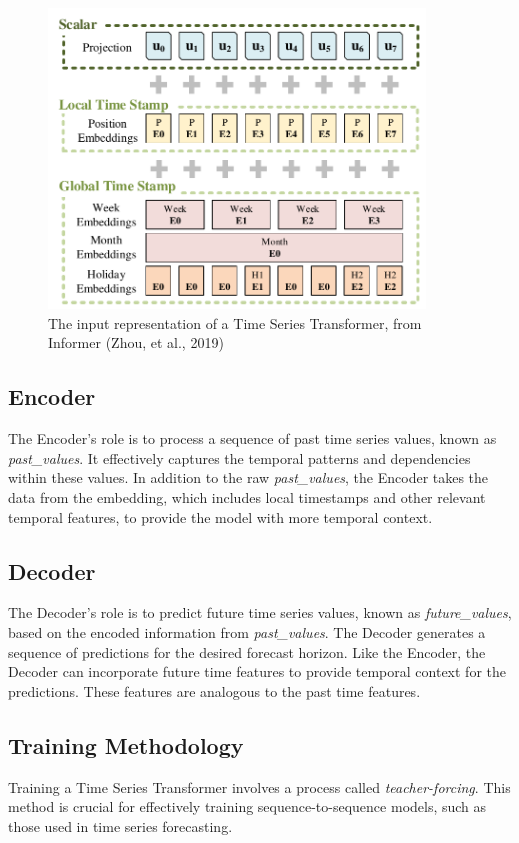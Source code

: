 \begin{figure}[htbp]
    \centering
    \includegraphics[width=10cm]{3_ChapterTranformerVariants/figuras/Embbeding.pdf}
    \caption{The input representation of a Time Series Transformer, from Informer (Zhou, et al., 2019)\cite{zhou2021informerefficienttransformerlong}}
    \end{figure}



\subsection{Encoder}
The Encoder’s role is to process a sequence of past time series values, known as \textit{past\_values}. It effectively captures the temporal patterns and dependencies within these values. In addition to the raw \textit{past\_values}, the Encoder takes the data from the embedding, which includes local timestamps and other relevant temporal features, to provide the model with more temporal context.

\subsection{Decoder}
The Decoder’s role is to predict future time series values, known as \textit{future\_values}, based on the encoded information from \textit{past\_values}. The Decoder generates a sequence of predictions for the desired forecast horizon. Like the Encoder, the Decoder can incorporate future time features to provide temporal context for the predictions. These features are analogous to the past time features.

\subsection{Training Methodology}
Training a Time Series Transformer involves a process called \textit{teacher-forcing}. This method is crucial for effectively training sequence-to-sequence models, such as those used in time series forecasting.

